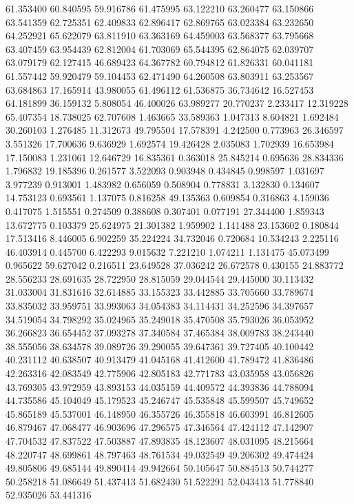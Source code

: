 61.353400
60.840595
59.916786
61.475995
63.122210
63.260477
63.150866
63.541359
62.725351
62.409833
62.896417
62.869765
63.023384
63.232650
64.252921
65.622079
63.811910
63.363169
64.459003
63.568377
63.795668
63.407459
63.954439
62.812004
61.703069
65.544395
62.864075
62.039707
63.079179
62.127415
46.689423
64.367782
60.794812
61.826331
60.041181
61.557442
59.920479
59.104453
62.471490
64.260508
63.803911
63.253567
63.684863
17.165914
43.980055
61.496112
61.536875
36.734642
16.527453
64.181899
36.159132
5.808054
46.400026
63.989277
20.770237
2.233417
12.319228
65.407354
18.738025
62.707608
1.463665
33.589363
1.047313
8.604821
1.692484
30.260103
1.276485
11.312673
49.795504
17.578391
4.242500
0.773963
26.346597
3.551326
17.700636
9.636929
1.692574
19.426428
2.035083
1.702939
16.653984
17.150083
1.231061
12.646729
16.835361
0.363018
25.845214
0.695636
28.834336
1.796832
19.185396
0.261577
3.522093
0.903948
0.434845
0.998597
1.031697
3.977239
0.913001
1.483982
0.656059
0.508904
0.778831
3.132830
0.134607
14.753123
0.693561
1.137075
0.816258
49.135363
0.609854
0.316863
4.159036
0.417075
1.515551
0.274509
0.388608
0.307401
0.077191
27.344400
1.859343
13.672775
0.103379
25.624975
21.301382
1.959902
1.141488
23.153602
0.180844
17.513416
8.446005
6.902259
35.224224
34.732046
0.720684
10.534243
2.225116
46.403914
0.445700
6.422293
9.015632
7.221210
1.074211
1.131475
45.073499
0.965622
59.627042
0.216511
23.649528
37.036242
26.672578
0.430155
24.883772
28.556233
28.691635
28.722950
28.815059
29.044544
29.445000
30.113432
31.033004
31.831616
32.614885
33.155323
33.442885
33.705660
33.789674
33.835032
33.959751
33.993063
34.054383
34.114431
34.252596
34.397657
34.519054
34.798292
35.024965
35.249018
35.470508
35.793026
36.053952
36.266823
36.654452
37.093278
37.340584
37.465384
38.009783
38.243440
38.555056
38.634578
39.089726
39.290055
39.647361
39.727405
40.100442
40.231112
40.638507
40.913479
41.045168
41.412600
41.789472
41.836486
42.263316
42.083549
42.775906
42.805183
42.771783
43.035958
43.056826
43.769305
43.972959
43.893153
44.035159
44.409572
44.393836
44.788094
44.735586
45.104049
45.179523
45.246747
45.535848
45.599507
45.749652
45.865189
45.537001
46.148950
46.355726
46.355818
46.603991
46.812605
46.879467
47.068477
46.903696
47.296575
47.346564
47.424112
47.142907
47.704532
47.837522
47.503887
47.893835
48.123607
48.031095
48.215664
48.220747
48.699861
48.797463
48.761534
49.032549
49.206302
49.474424
49.805806
49.685144
49.890414
49.942664
50.105647
50.884513
50.744277
50.258218
51.086649
51.437413
51.682430
51.522291
52.043413
51.778840
52.935026
53.441316
